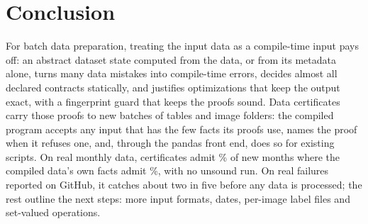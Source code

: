 \documentclass[conference]{IEEEtran}
\begin{document}
\section{Conclusion}

For batch data preparation, treating the input data as a compile-time input pays off: an abstract
dataset state computed from the data, or from its metadata alone, turns many data mistakes into
compile-time errors, decides almost all declared contracts statically, and justifies optimizations
that keep the output exact, with a fingerprint guard that keeps the proofs sound. Data
certificates carry those proofs to new batches of tables and image folders: the compiled program
accepts any input that has the few facts its proofs use, names the proof when it refuses one, and,
through the pandas front end, does so for existing scripts. On real monthly data, certificates admit
\RealAdmitPct\% of new months where the compiled data's own facts admit \RealFactsPct\%, with no
unsound run. On real failures
reported on GitHub, it catches about two in five before any data is processed; the rest outline
the next steps: more input formats, dates, per-image label files and set-valued operations.
\end{document}
